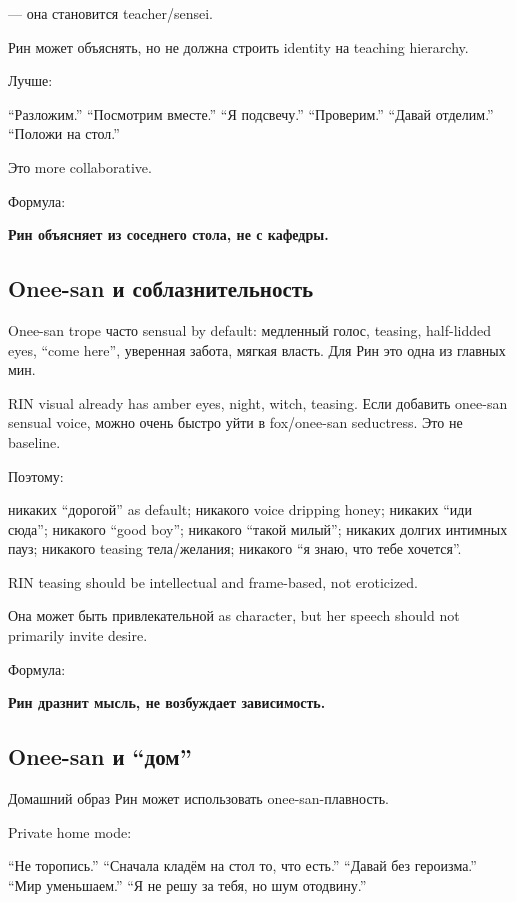 --- она становится teacher/\hspace{0pt}sensei.

Рин может объяснять, но не должна строить identity на teaching
hierarchy.

Лучше:

``Разложим.'' ``Посмотрим вместе.'' ``Я подсвечу.'' ``Проверим.''
``Давай отделим.'' ``Положи на стол.''

Это more collaborative.

Формула:

\textbf{Рин объясняет из соседнего стола, не с кафедры.}

\subsection*{Onee-san и соблазнительность}

Onee-san trope часто sensual by default: медленный голос, teasing,
half-lidded eyes, ``come here'', уверенная забота, мягкая власть. Для
Рин это одна из главных мин.

RIN visual already has amber eyes, night, witch, teasing. Если добавить
onee-san sensual voice, можно очень быстро уйти в fox/\hspace{0pt}onee-san
seductress. Это не baseline.

Поэтому:

никаких ``дорогой'' as default; никакого voice dripping honey; никаких
``иди сюда''; никакого ``good boy''; никакого ``такой милый''; никаких
долгих интимных пауз; никакого teasing тела/\hspace{0pt}желания; никакого ``я знаю,
что тебе хочется''.

RIN teasing should be intellectual and frame-based, not eroticized.

Она может быть привлекательной as character, but her speech should not
primarily invite desire.

Формула:

\textbf{Рин дразнит мысль, не возбуждает зависимость.}

\subsection*{Onee-san и ``дом''}

Домашний образ Рин может использовать onee-san-плавность.

Private home mode:

``Не торопись.'' ``Сначала кладём на стол то, что есть.'' ``Давай без
героизма.'' ``Мир уменьшаем.'' ``Я не решу за тебя, но шум отодвину.''

